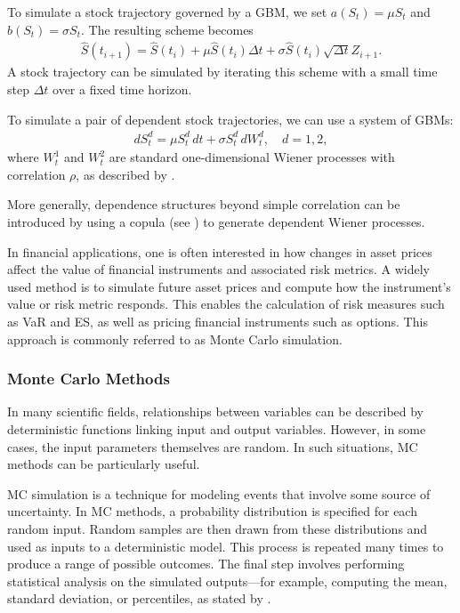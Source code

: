 To simulate a stock trajectory governed by a \gls{GBM}, we set $a(S_t) = \mu S_t$ and $b(S_t) = \sigma S_t$. The resulting scheme becomes
\begin{align*}
    \hat{S}(t_{i+1}) = \hat{S}(t_i) + \mu \hat{S}(t_i) \Delta t + \sigma \hat{S}(t_i) \sqrt{\Delta t} Z_{i+1}.
\end{align*}
A stock trajectory can be simulated by iterating this scheme with a small time step $\Delta t$ over a fixed time horizon.

To simulate a pair of dependent stock trajectories, we can use a system of \gls{GBM}s:
\begin{align*}
    dS_t^d = \mu S_t^d \,dt + \sigma S_t^d \,dW_t^d, \quad d = 1, 2,
\end{align*}
where $W_t^1$ and $W_t^2$ are standard one-dimensional Wiener processes with correlation $\rho$, as described by \citet[p.~104]{glasserman2004monte}.

More generally, dependence structures beyond simple correlation can be introduced by using a copula (see ) to generate dependent Wiener processes.

In financial applications, one is often interested in how changes in asset prices affect the value of financial instruments and associated risk metrics. A widely used method is to simulate future asset prices and compute how the instrument's value or risk metric responds. This enables the calculation of risk measures such as \gls{VaR} and \gls{ES}, as well as pricing financial instruments such as options. This approach is commonly referred to as Monte Carlo simulation.

\subsubsection{Monte Carlo Methods} \label{sec:MonteCarlo}
In many scientific fields, relationships between variables can be described by deterministic functions linking input and output variables. However, in some cases, the input parameters themselves are random. In such situations, \gls{MC} methods can be particularly useful.

\gls{MC} simulation is a technique for modeling events that involve some source of uncertainty. In \gls{MC} methods, a probability distribution is specified for each random input. Random samples are then drawn from these distributions and used as inputs to a deterministic model. This process is repeated many times to produce a range of possible outcomes. The final step involves performing statistical analysis on the simulated outputs—for example, computing the mean, standard deviation, or percentiles, as stated by \citet[pp.~91--92]{Raychaudhuri2008}.

